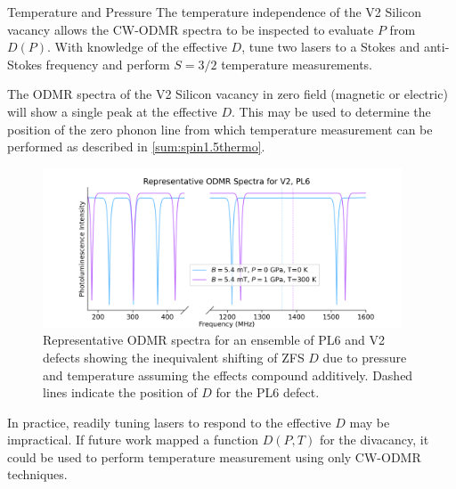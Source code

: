 \begin{proposal}{Temperature and Pressure}
    The temperature independence of the V2 Silicon vacancy allows the CW-ODMR spectra to be inspected to evaluate $P$ from $D(P)$. 
    With knowledge of the effective $D$, tune two lasers to a Stokes and anti-Stokes frequency and perform $S=3/2$ temperature measurements. 
\end{proposal}


The ODMR spectra of the V2 Silicon vacancy in zero field (magnetic or electric) will show a single peak at the effective $D$. 
This may be used to determine the position of the zero phonon line from which temperature measurement can be performed as described in \ref{sum:spin1.5thermo}. 

\begin{figure}[h]
    \begin{center}
        \includegraphics[width=0.95\textwidth]{figures/ODMR-multimodal-s15magnet-s1PT.png}
    \end{center}
    \caption{Representative ODMR spectra for an ensemble of PL6 and V2 defects showing the inequivalent shifting of ZFS $D$ due to pressure and temperature assuming the effects compound additively. Dashed lines indicate the position of $D$ for the PL6 defect.}
    \label{fig:multi-TP}
\end{figure}




In practice, readily tuning lasers to respond to the effective $D$ may be impractical. If future work mapped a function $D(P,T)$ for the divacancy, it could be used to perform temperature measurement using only CW-ODMR techniques. 

